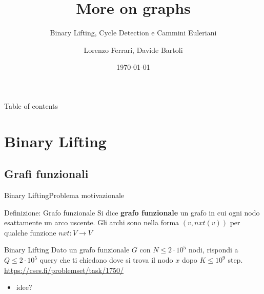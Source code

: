 \documentclass[compress]{beamer}
\title{More on graphs}
\subtitle{Binary Lifting, Cycle Detection e Cammini Euleriani}
\author{Lorenzo Ferrari, Davide Bartoli}
\date{\today}
\begin{document}
\begin{frame}
    \maketitle
\end{frame}

\begin{frame}{Table of contents}
  \tableofcontents
\end{frame}

\section{Binary Lifting}
\subsection{Grafi funzionali}
\begin{frame}{Binary Lifting}{Problema motivazionale}
    \begin{block}{Definizione: Grafo funzionale}
        Si dice \textbf{grafo funzionale} un grafo in cui ogni nodo  esattamente un arco uscente.
        Gli archi sono nella forma $(v, nxt(v))$ per qualche funzione $nxt: V \to V$
    \end{block}
        \pause
    \begin{exampleblock}{Binary Lifting}
        Dato un grafo funzionale $G$ con $N \leq 2 \cdot 10^5$ nodi, rispondi a $Q \leq 2 \cdot 10^5$ query che ti chiedono dove si trova il nodo $x$ dopo $K \leq 10^9$ step.
        \vfill
        \small{\underline{\url{https://cses.fi/problemset/task/1750/}}}
    \end{exampleblock}
    \pause
    \begin{itemize}
        \item idee?
    \end{itemize}
\end{frame}
\end{document}

